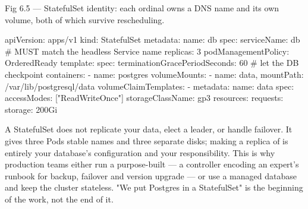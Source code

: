 \begin{wbfigure}{Fig 6.5 — StatefulSet identity: each ordinal owns a DNS name and its own volume, both of which survive rescheduling.}
\end{wbfigure}

\begin{k8sbox}
apiVersion: apps/v1
kind: StatefulSet
metadata: { name: db }
spec:
  serviceName: db          # MUST match the headless Service name
  replicas: 3
  podManagementPolicy: OrderedReady
  template:
    spec:
      terminationGracePeriodSeconds: 60   # let the DB checkpoint
      containers:
        - name: postgres
          volumeMounts:
            - { name: data, mountPath: /var/lib/postgresql/data }
  volumeClaimTemplates:
    - metadata: { name: data }
      spec:
        accessModes: ["ReadWriteOnce"]
        storageClassName: gp3
        resources: { requests: { storage: 200Gi } }
\end{k8sbox}

\begin{misconception}
A StatefulSet does not replicate your data, elect a leader, or handle failover. It gives three Pods stable names and three separate disks; making  a replica of  is entirely your database's configuration and your responsibility. This is why production teams either run a purpose-built  --- a controller encoding an expert's runbook for backup, failover and version upgrade --- or use a managed database and keep the cluster stateless. "We put Postgres in a StatefulSet" is the beginning of the work, not the end of it.
\end{misconception}

